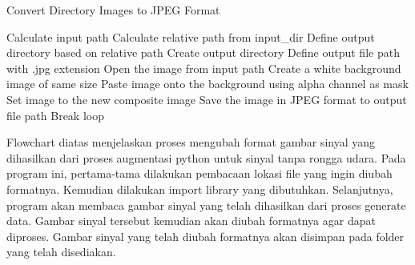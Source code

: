 \begin{algorithm}
  \caption{Convert Directory Images to JPEG Format}
  \begin{algorithmic}[1]
                  \State Calculate input path
                  \State Calculate relative path from input\_dir
                  \State Define output directory based on relative path
                      \State Create output directory
                  \EndIf
                  \State Define output file path with .jpg extension
                  \State Open the image from input path
                      \State Create a white background image of same size
                      \State Paste image onto the background using alpha channel as mask
                      \State Set image to the new composite image
                  \EndIf
                  \State Save the image in JPEG format to output file path
                  \State Break loop 
              \EndIf
          \EndFor
      \EndFor
  \EndProcedure
  \end{algorithmic}
\end{algorithm}

Flowchart diatas menjelaskan proses mengubah format gambar sinyal yang dihasilkan dari proses augmentasi python untuk sinyal tanpa rongga udara. Pada program ini, pertama-tama dilakukan pembacaan lokasi file yang ingin diubah formatnya. Kemudian dilakukan import library yang dibutuhkan. Selanjutnya, program akan membaca gambar sinyal yang telah dihasilkan dari proses generate data. Gambar sinyal tersebut kemudian akan diubah formatnya agar dapat diproses. Gambar sinyal yang telah diubah formatnya akan disimpan pada folder yang telah disediakan.


